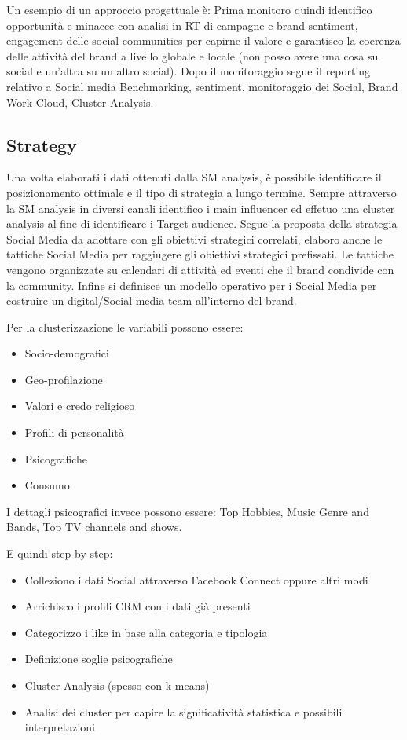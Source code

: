 \documentclass[11pt]{article}
\newenvironment{nosepitemize}{\begin{itemize}[noitemsep,topsep=0ex]}{\end{itemize}}
\begin{document}
Un esempio di un approccio progettuale è:
Prima monitoro quindi identifico opportunità e minacce con analisi in RT di campagne e brand sentiment, engagement delle social communities per capirne il valore e garantisco la coerenza delle attività del brand a livello globale e locale (non posso avere una cosa su social e un'altra su un altro social). 
Dopo il monitoraggio segue il reporting relativo a Social media Benchmarking, sentiment, monitoraggio dei Social, Brand Work Cloud, Cluster Analysis.

\subsection{Strategy}
Una volta elaborati i dati ottenuti dalla SM analysis, è possibile identificare il posizionamento ottimale e il tipo di strategia a lungo termine. 	\newline
Sempre attraverso la SM analysis in diversi canali identifico i main influencer ed effetuo una cluster analysis al fine di identificare i Target audience. \newline
Segue la proposta della strategia Social Media da adottare con gli obiettivi strategici correlati, elaboro anche le tattiche Social Media per raggiugere gli obiettivi strategici prefissati. \newline
Le tattiche vengono organizzate su calendari di attività ed eventi che il brand condivide con la community. \newline
Infine si definisce un modello operativo per i Social Media per costruire un digital/Social media team all'interno del brand.

Per la clusterizzazione le variabili possono essere: 
\begin{nosepitemize}
	\item Socio-demografici
	\item Geo-profilazione
	\item Valori e credo religioso
	\item Profili di personalità
	\item Psicografiche
	\item Consumo
\end{nosepitemize}
I dettagli psicografici invece possono essere: Top Hobbies, Music Genre and Bands, Top TV channels and shows.

E quindi step-by-step:
\begin{nosepitemize}
	\item Colleziono i dati Social attraverso Facebook Connect oppure altri modi
	\item Arrichisco i profili CRM con i dati già presenti
	\item Categorizzo i like in base alla categoria e tipologia
	\item Definizione soglie psicografiche
	\item Cluster Analysis (spesso con k-means)
	\item Analisi dei cluster per capire la significatività statistica e possibili interpretazioni
\end{nosepitemize}
\end{document}
